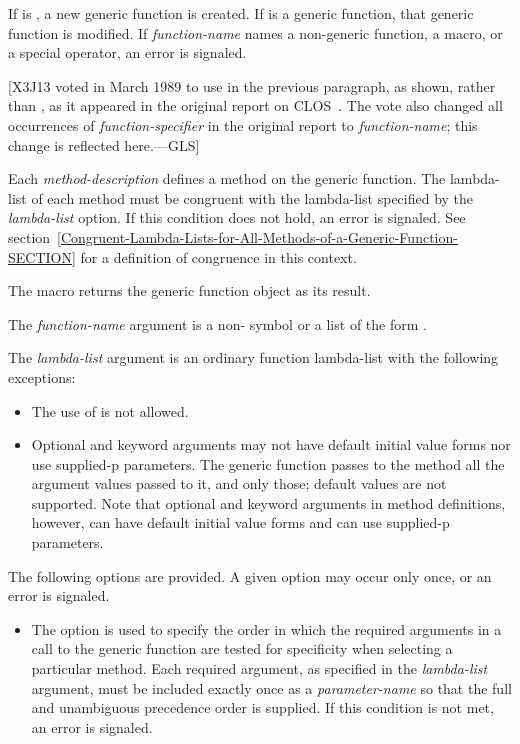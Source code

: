 \begin{defmac}
If  is , a new
generic function is created.  If  is
a generic function, that generic function 
is modified.  If \emph{function-name} names a non-generic
function, a macro, or a special operator, an error is signaled.

[X3J13 voted in March 1989  to use 
in the previous paragraph, as shown, rather than ,
as it appeared in the original report on CLOS~\cite{SIGPLAN-CLOS,LASC-CLOS-PART-2}.
The vote also changed all occurrences of \emph{function-specifier} in the
original report to \emph{function-name}; this change is reflected here.---GLS]

Each \emph{method-description} defines a method on the generic function.
The lambda-list of each method must be congruent with the lambda-list
specified by the \emph{lambda-list} option.  If this condition
does not hold, an error is signaled.
See section~\ref{Congruent-Lambda-Lists-for-All-Methods-of-a-Generic-Function-SECTION}
for a definition
of congruence in this context.

The macro  returns the generic function object 
as its result.

The \emph{function-name} argument is a non- symbol or a
list of the form .

The \emph{lambda-list} argument is an ordinary function lambda-list
with the following exceptions:

\begin{itemize}
\item 
The use of  is not allowed. 

\item 
Optional and keyword arguments may not have default initial value forms
nor use supplied-p parameters.
The generic function passes to the method all the argument values passed to
it, and only those; default values are not supported.
Note that optional and keyword arguments in method definitions, however,
can have default initial value forms and can use supplied-p parameters. 
\end{itemize}

The following options are provided.  A given option may occur only once,
or an error is signaled.
\begin{itemize}
 
\item  
The  option is used to specify the
order in which the required arguments in a call to the generic
function are tested for specificity when selecting a particular
method.  Each required argument, as specified in the \emph{lambda-list}
argument, must be included exactly once as a \emph{parameter-name} so that the
full and unambiguous precedence order is 
supplied.  If this condition is not met, an error is signaled.


\end{itemize}
\end{defmac}
